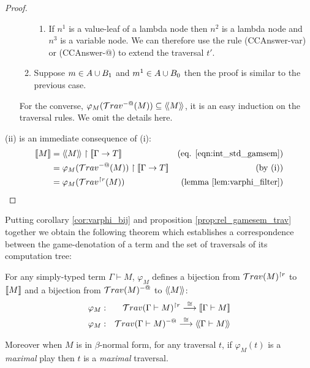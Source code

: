 \begin{proof}
\begin{itemize}
\begin{enumerate}
\begin{enumerate}
        \item If $n^1$ is a value-leaf of a lambda node then $n^2$ is a lambda node and $n^3$ is a variable node.
        We can therefore use the rule (CCAnswer-var) or (CCAnswer-@) to extend the traversal $t'$.
        \end{enumerate}

    \item Suppose $m \in A \cup B_1$ and $m^1 \in A \cup B_0$ then
    the proof is similar to the previous case.
    \end{enumerate}


  For the converse, $\varphi_{M}( \mathcal{T}rav^{-@}(M) ) \subseteq {\langle\!\langle M \rangle\!\rangle}$, it is an easy induction
  on the traversal rules. We omit the details here.
\end{itemize}

(ii) is an immediate consequence of (i):
\begin{align*}
\sem{M} &= \intersem{M} \upharpoonright \sem{\Gamma \rightarrow T} & \mbox{(eq. \ref{eqn:int_std_gamsem})} \\
        &= \varphi_M(\travset^{-@}(M)) \upharpoonright \sem{\Gamma \rightarrow T} & \mbox{(by (i))}\\
        &= \varphi_M(\travset^{\upharpoonright r}(M)) & \mbox{(lemma \ref{lem:varphi_filter})}
\end{align*}
\end{proof}


Putting corollary \ref{cor:varphi_bij} and proposition
\ref{prop:rel_gamesem_trav} together we obtain the following theorem
which establishes a correspondence between the game-denotation of a
term and the set of traversals of its computation tree:

\begin{thm}
\label{thm:correspondence}
 For any simply-typed term $\Gamma \vdash M$,
$\varphi_M$ defines a bijection from $\mathcal{T}rav(M)^{\upharpoonright
r}$ to ${[\![ M ]\!]}$ and a bijection from $\mathcal{T}rav(M)^{-@}$ to
${\langle\!\langle M \rangle\!\rangle}$:
\begin{eqnarray*}
 \varphi_M  &:& \mathcal{T}rav(\Gamma \vdash M)^{\upharpoonright r} \stackrel{\cong}{\longrightarrow} {[\![ \Gamma \vdash M ]\!]} \\
 \varphi_M  &:& \mathcal{T}rav(\Gamma \vdash M)^{-@} \stackrel{\cong}{\longrightarrow} {\langle\!\langle \Gamma \vdash M \rangle\!\rangle}
\end{eqnarray*}

Moreover when $M$ is in $\beta$-normal form, for any traversal $t$, if $\varphi_M(t)$ is a \emph{maximal} play then $t$ is a \emph{maximal} traversal.
\end{thm}

